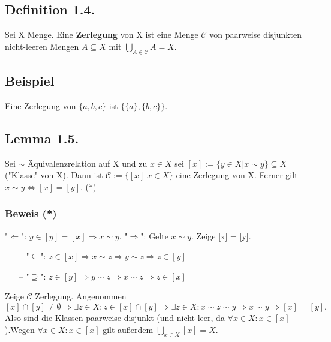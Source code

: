 \documentclass[a4paper,twoside]{article}
\begin{document}
\subsection*{Definition 1.4.}
Sei X Menge. Eine \textbf{Zerlegung} von X ist eine Menge $\mathcal{C}$ von paarweise disjunkten nicht-leeren Mengen $A \subseteq X$ mit $\bigcup_{A \in \mathcal{C}} A = X$.

\subsection*{Beispiel}
Eine Zerlegung von $\{ a, b, c\}$ ist $\{\{ a\}, \{ b, c\}\}$.

\subsection*{Lemma 1.5.}
Sei $\sim$ Äquivalenzrelation auf X und zu $x \in X$ sei $[x] := \{y \in X | x \sim y\} \subseteq X$ ("Klasse" von X).\newline
Dann ist $\mathcal{C} := \{[x] | x \in X\}$ eine Zerlegung von X.\newline
Ferner gilt $x \sim y \Leftrightarrow [x] =  [y]$. (*)\newline
\subsubsection*{Beweis (*)}
"$\Leftarrow$": $y \in [y] = [x] \Rightarrow x \sim y$.\newline
"$\Rightarrow$": Gelte $x \sim y$. Zeige [x] = [y].
\begin{itemize}
\item[--] "$\subseteq$": $z \in [x] \Rightarrow x \sim z \Rightarrow y \sim z \Rightarrow z \in [y]$
\item[--] "$\supseteq$": $z \in [y] \Rightarrow y \sim z \Rightarrow x \sim z \Rightarrow z \in [x]$\newline
\end{itemize}
Zeige $\mathcal{C}$ Zerlegung.\newline
Angenommen $[x] \cap [y] \neq \emptyset \Rightarrow \exists z \in X: z \in [x] \cap [y] \Rightarrow \exists z \in X: x \sim z \sim y \Rightarrow x \sim y \Rightarrow [x] = [y].$\newline Also sind die Klassen paarweise disjunkt (und nicht-leer, da $\forall x \in X: x \in [x]$).\newline Wegen $\forall x \in X: x \in [x]$ gilt außerdem $\bigcup_{x \in X} [x] = X$.
\end{document}
